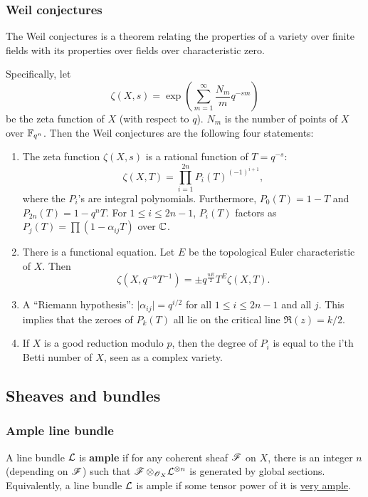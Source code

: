 \documentclass[11pt, english]{article}
\begin{document}
\subsubsection{Weil conjectures}
\label{weilconjectures}

The Weil conjectures is a theorem relating the properties of a variety over finite fields with its properties over fields over characteristic zero.

Specifically, let 
$$
\zeta(X,s) = \exp \left(\sum_{m=1}^\infty \frac{N_m}{m} q^{-sm}  \right)
$$
be the zeta function of $X$ (with respect to $q$). $N_m$ is the number of points of $X$ over $\mathbb{F}_{q^n}$. Then the Weil conjectures are the following four statements:
\begin{enumerate}
\item The zeta function $\zeta(X,s)$ is a rational function of $T=q^{-s}$:
$$
\zeta(X,T) = \prod_{i=1}^{2n} P_i(T)^{(-1)^{i+1}},
$$
where the $P_i$'s are integral polynomials. Furthermore, $P_0(T)=1-T$ and $P_{2n}(T) = 1-q^nT$. For $1 \leq i \leq 2n-1$, $P_i(T)$ factors as $P_j(T)=\prod (1-\alpha_{ij}T)$ over $\mathbb{C}$. 
\item There is a functional equation. Let $E$ be the topological Euler characteristic of $X$. Then
$$
\zeta(X,q^{-n} T^{-1}) = \pm q^{\frac {nE}{2}} T^E \zeta(X,T).
$$
\item A ``Riemann hypothesis'':  $\lvert \alpha_{ij} \rvert = q^{i/2}$ for all $1 \leq i \leq 2n-1$ and all $j$. This implies that the zeroes of $P_k(T)$ all lie on the critical line $\Re(z)=k/2$. 
\item If $X$ is a good reduction modulo $p$, then the degree of $P_i$ is equal to the i'th Betti number of $X$, seen as a complex variety.
\end{enumerate}

\subsection{Sheaves and bundles}
\subsubsection{Ample line bundle}
\label{amplelinebundle}
A line bundle $\mathcal{L}$ is \textbf{ample} if for any coherent sheaf $\operatorname{\mathscr{F}}$ on $X$, there is an integer $n$ (depending on $\operatorname{\mathscr{F}}$) such that $\operatorname{\mathscr{F}} \otimes_{\operatorname{\mathscr{O}}_X} \mathcal{L}^{\otimes n}$ is generated by global sections. Equivalently, a line bundle $\mathcal{L}$ is ample if some tensor power of it is \hyperref[veryample]{very ample}.
\end{document}
